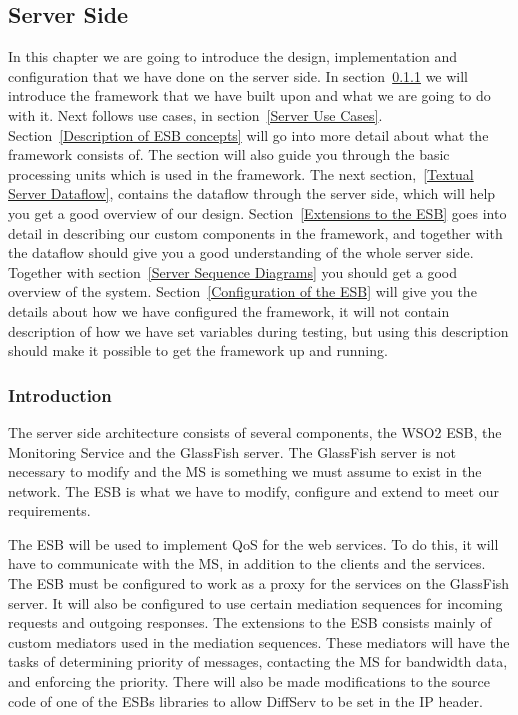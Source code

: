     \subsection{Server Side}\label{Server Side Design}
    In this chapter we are going to introduce the design, implementation and configuration that we have done on the server side. In section~\ref{Server Introduction} we will introduce the framework that we have built upon and what we are going to do with it. Next follows use cases, in section~\ref{Server Use Cases}. Section~\ref{Description of ESB concepts} will go into more detail about what the framework consists of. The section will also guide you through the basic processing units which is used in the framework. The next section,~\ref{Textual Server Dataflow}, contains the dataflow through the server side, which will help you get a good overview of our design. Section~\ref{Extensions to the ESB} goes into detail in describing our custom components in the framework, and together with the dataflow should give you a good understanding of the whole server side. Together with section~\ref{Server Sequence Diagrams} you should get a good overview of the system. Section~\ref{Configuration of the ESB} will 
give you the details 
about how we 
have configured the framework, it will not contain description of how we have set variables during testing, but using this description should make it possible to get the framework up and running.

    \subsubsection{Introduction}\label{Server Introduction}
    The server side architecture consists of several components, the WSO2 ESB, the Monitoring Service and the GlassFish server. The GlassFish server is not necessary to modify and the MS is something we must assume to exist in the network. The ESB is what we have to modify, configure and extend to meet our requirements.

    The ESB will be used to implement QoS for the web services. To do this, it will have to communicate with the MS, in addition to the clients and the services. The ESB must be configured to work as a proxy for the services on the GlassFish server. It will also be configured to use certain mediation sequences for incoming requests and outgoing responses. The extensions to the ESB consists mainly of custom mediators used in the mediation sequences. These mediators will have the tasks of determining priority of messages, contacting the MS for bandwidth data, and enforcing the priority. There will also be made modifications to the source code of one of the ESBs libraries to allow DiffServ to be set in the IP header.
    

